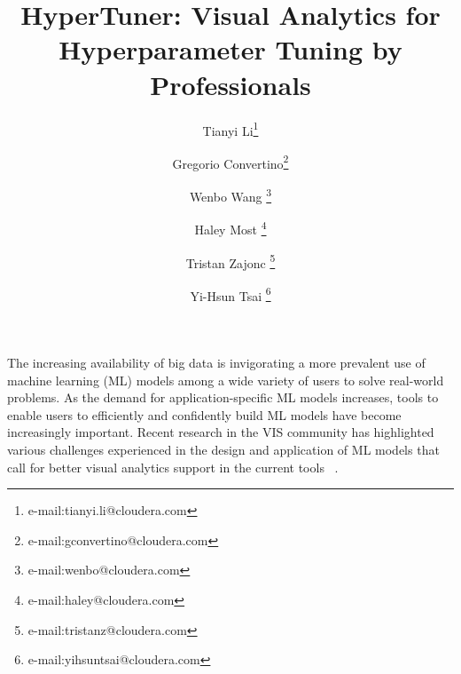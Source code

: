 \documentclass[preprint]{vgtc}        %
\title{HyperTuner: Visual Analytics for Hyperparameter Tuning by Professionals}
\author{Tianyi Li\thanks{e-mail:tianyi.li@cloudera.com} 
\and Gregorio Convertino\thanks{e-mail:gconvertino@cloudera.com} 
\and Wenbo Wang \thanks{e-mail:wenbo@cloudera.com} 
\and Haley Most \thanks{e-mail:haley@cloudera.com} 
\and Tristan Zajonc \thanks{e-mail:tristanz@cloudera.com} 
\and Yi-Hsun Tsai \thanks{e-mail:yihsuntsai@cloudera.com}}
\affiliation{\scriptsize UX Design and Cloudera Data Science Workbench \\ Cloudera }
\begin{document}


\maketitle




The increasing availability of big data is invigorating a more prevalent use of machine learning (ML) models among a wide variety of users to solve real-world problems. As the demand for application-specific ML models increases, tools to enable users to efficiently and confidently build ML models have become increasingly important. Recent research in the VIS community has highlighted various challenges experienced in the design and application of ML models that call for better visual analytics support in the current tools ~\cite{Sacha2016TheAnalytics}. 
\end{document}
